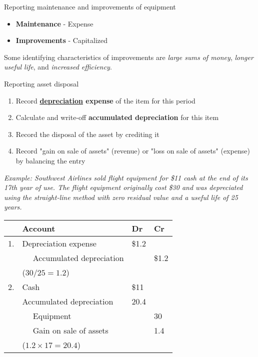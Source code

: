 \begin{theorem}
    {Reporting maintenance and improvements of equipment}
    \begin{itemize}
        \item \textbf{Maintenance} - Expense
        \item \textbf{Improvements} - Capitalized
    \end{itemize}
    Some identifying characteristics of improvements are \textit{large sums of money}, \textit{longer useful life}, and \textit{increased efficiency}.
\end{theorem}

\begin{theorem}
    {Reporting asset disposal}
    \begin{enumerate}
        \item Record \textbf{\hyperref[subsec:depreciation]{depreciation} expense} of the item for this period
        \item Calculate and write-off \textbf{accumulated depreciation} for this item
        \item Record the disposal of the asset by crediting it
        \item Record "gain on sale of assets" (revenue) or "loss on sale of assets" (expense) by balancing the entry
    \end{enumerate}
    \tcblower
    \textit{Example: Southwest Airlines sold flight equipment for \$11 cash at the end of its 17th year of use. The flight equipment originally cost \$30 and was depreciated using the straight-line method with zero residual value and a useful life of 25 years.}

    \begin{tabular}{llll}
           & \textbf{Account}                 & \textbf{Dr} & \textbf{Cr} \\
        \hline
        1. & Depreciation expense             & \$1.2       &             \\
           & $\quad$ Accumulated depreciation &             & \$1.2       \\
           & (${30}/{25}=1.2$)                &             &             \\
        \hline
        2. & Cash                             & \$11        &             \\
           & Accumulated depreciation         & 20.4        &             \\
           & $\quad$ Equipment                &             & 30          \\
           & $\quad$ Gain on sale of assets   &             & 1.4         \\
           & ($1.2 \times 17=20.4$)           &             &             \\
    \end{tabular}
\end{theorem}
\label{subsec:asset_disposal}

